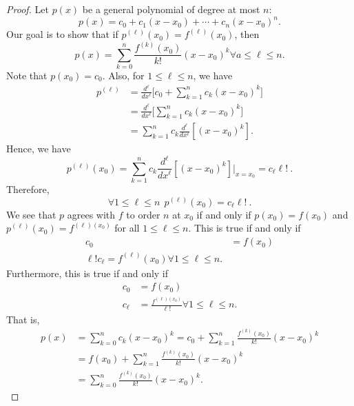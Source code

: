 \begin{proof}
Let \( p(x) \) be a general polynomial of degree at most \( n \):
\[  p(x) = {c}_{0} + {c}_{1} (x - {x}_{0}) + \cdots + {c}_{n} (x - {x}_{0})^{n}. \]
Our goal is to show that if \( p^{(\ell)}({x}_{0}) = f^{(\ell)}({x}_{0}) \), then
\[  p(x) = \sum_{ k= 0  }^{ n } \frac{ f^{(k)}({x}_{0}) }{  k!  }  (x - {x}_{0} )^{k} \forall a \leq  \ell \leq n.  \]
Note that \( p({x}_{0}) = {c}_{0} \). Also, for \( 1 \leq \ell \leq n  \), we have
\begin{align*}
    p^{(\ell)} &= \frac{ d^{\ell} }{ d x^{\ell} }  \Big[ {c}_{0} + \sum_{ k=1  }^{ n } {c}_{k } (x - {x}_{0})^{k } \Big] \\
               &= \frac{ d^{\ell} }{ d x^{\ell} }  \Big[ \sum_{ k=1  }^{ n } {c}_{k } (x - {x}_{0})^{k} \Big] \\
               &= \sum_{ k=1  }^{ n } {c}_{k} \frac{ d^{\ell} }{ d x^{\ell} }  [(x - {x}_{0})^{k }].
\end{align*}
Hence, we have 
\[  p^{(\ell)}({x}_{0}) = \sum_{ k=1  }^{ n } {c}_{k } \frac{ d^{\ell} }{ d x^{\ell} }  [(x - {x}_{0})^{k}] \Big|_{x = {x}_{0}} = {c}_{\ell} \ell!  \ .  \]
Therefore, 
\[  \forall 1 \leq \ell \leq n \ \ p^{(\ell)} ({x}_{0}) = {c}_{\ell} \ell!  \ .\]
We see that \( p \) agrees with \( f  \) to order \( n \) at \( {x}_{0} \) if and only if \( p({x}_{0}) = f({x}_{0}) \) and \( p^{(\ell)}({x}_{0}) = f^{(\ell) ({x}_{0})}  \) for all \( 1 \leq \ell \leq n  \). This is true if and only if
\begin{align*}
    {c}_{0} &= f({x}_{0}) \\
    \ell ! {c}_{\ell} = f^{(\ell)}({x}_{0}) \forall 1 \leq \ell \leq n. 
\end{align*}
Furthermore, this is true if and only if   
\begin{align*}
    {c}_{0} &= f({x}_{0}) \\
    {c}_{\ell} &= \frac{ f^{(\ell)({x}_{0})}  }{ \ell!  } \forall 1 \leq \ell \leq n. 
\end{align*}
That is,
\begin{align*}
    p(x) &= \sum_{ k=0  }^{ n } {c}_{k } (x - {x}_{0})^{k } = {c}_{0} + \sum_{ k=1  }^{ n } \frac{ f^{(k)}({x}_{0}) }{ k!  } (x - {x}_{0})^{k} \\
         &= f({x}_{0}) + \sum_{ k=1  }^{ n } \frac{ f^{(k)}({x}_{0}) }{ k!  } (x - {x}_{0})^{k} \\
         &= \sum_{ k= 0  }^{  n  } \frac{ f^{(k)}({x}_{0} ) }{ k!  } (x - {x}_{0})^{k}.
\end{align*}
\end{proof}

